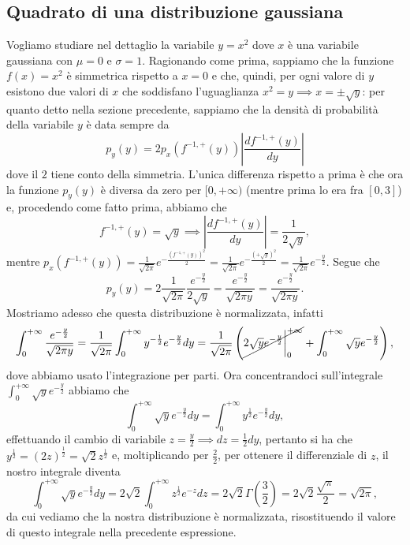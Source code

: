 \documentclass{report}
\begin{document}
\subsection{Quadrato di una distribuzione gaussiana}

Vogliamo studiare nel dettaglio la variabile $y = x^2$ dove $x$ è una variabile gaussiana con $\mu = 0$ e $\sigma = 1$. Ragionando come prima, sappiamo che la funzione $f(x) = x^2$ è simmetrica rispetto a $x = 0$ e che, quindi, per ogni valore di $y$ esistono due valori di $x$ che soddisfano l'uguaglianza $x^2 = y \implies x = \pm \sqrt{y}$: per quanto detto nella sezione precedente, sappiamo che la densità di probabilità della variabile $y$ è data sempre da
$$
p_y(y) = 2p_x(f^{-1, +}(y)) \left| \frac{df^{-1, +}(y)}{dy} \right|
$$
dove il $2$ tiene conto della simmetria. L'unica differenza rispetto a prima è che ora la funzione $p_y(y)$ è diversa da zero per $[0, +\infty)$ (mentre prima lo era fra $[0, 3]$) e, procedendo come fatto prima, abbiamo che
$$
f^{-1, +}(y) = \sqrt{y} \implies \left| \frac{df^{-1, +}(y)}{dy} \right| = \frac{1}{2\sqrt{y}},
$$
mentre $p_x(f^{-1, +}(y)) = \frac{1}{\sqrt{2\pi}}e^{-\frac{(f^{-1, +}(y))^2}{2}} = \frac{1}{\sqrt{2\pi}} e^{-\frac{(+\sqrt{y})^2}{2}} = \frac{1}{\sqrt{2\pi}} e^{-\frac{y}{2}}$. Segue che
$$
p_y(y) = 2 \frac{1}{\sqrt{2 \pi}} \frac{e^{-\frac{y}{2}}}{2\sqrt{y}} = \frac{e^{-\frac{y}{2}}}{\sqrt{2 \pi y}} = \frac{e^{-\frac{y}{2}}}{\sqrt{2 \pi y}}.
$$
Mostriamo adesso che questa distribuzione è normalizzata, infatti
$$
	\int_0^{+\infty} \frac{e^{-\frac{y}{2}}}{\sqrt{2 \pi y}} = \frac{1}{\sqrt{2 \pi}} \int_0^{+\infty} y^{-\frac{1}{2}} e^{-\frac{y}{2}} dy = \frac{1}{\sqrt{2 \pi}} \left( \cancel{2 \sqrt{y} e^{-\frac{y}{2}}\bigg|^{+\infty}_0} + \int_0^{+\infty} \sqrt{y}e^{-\frac{y}{2}} \right),
$$
dove abbiamo usato l'integrazione per parti. Ora concentrandoci sull'integrale $\int_0^{+\infty} \sqrt{y} e^{-\frac{y}{2}}$ abbiamo che
$$
		\int_0^{+\infty} \sqrt{y} e^{-\frac{y}{2}}dy = \int_0^{+\infty} y^{\frac{1}{2}} e^{-\frac{y}{2}}dy, 
$$
effettuando il cambio di variabile $z = \frac{y}{2} \implies dz = \frac{1}{2} dy$, pertanto si ha che $y^{\frac{1}{2}} = (2z)^{\frac{1}{2}} = \sqrt{2} z^{\frac{1}{2}}$ e, moltiplicando per $\frac{2}{2}$, per ottenere il differenziale di $z$, il nostro integrale diventa
$$
		\int_0^{+\infty} \sqrt{y} e^{-\frac{y}{2}}dy = 2 \sqrt{2} \int_0^{+\infty} z^{\frac{1}{2}} e^{-z}dz = 2 \sqrt{2} \Gamma(\frac{3}{2}) = 2 \sqrt{2} \frac{\sqrt{\pi}}{2} = \sqrt{2 \pi}, 
$$
da cui vediamo che la nostra distribuzione è normalizzata, risostituendo il valore di questo integrale nella precedente espressione.
\end{document}
